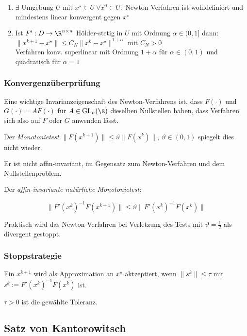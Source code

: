 \begin{enumerate}[label=(\alph*)]
	\item $\exists$ Umgebung $U$ mit $x^\star \in U \ \forall x^0 \in U : $ Newton-Verfahren ist wohldefiniert und mindestens linear konvergent gegen $x^\star$
	\item Ist $F' : D \to \R^{n \times n}$ Hölder-stetig in $U$ mit Ordnung $\alpha \in (0,1]$ dann: \\ $\|x^{k+1}-x^\star\| \leq C_N \|x^k-x^\star\|^{1+\alpha}$ mit $C_N > 0$ \\ Verfahren konv. superlinear mit Ordnung $1+\alpha$ für $\alpha \in (0,1)$ und quadratisch für $\alpha = 1$
\end{enumerate}

\subsubsection*{Konvergenzüberprüfung}

Eine wichtige Invarianzeigenschaft des Newton-Verfahrens ist, dass $F(\cdot)$ und $G(\cdot) = AF(\cdot)$ für $A \in \text{GL}_n(\R)$ dieselben Nullstellen haben, dass Verfahren sich also auf $F$ oder $G$ anwenden lässt.

Der \emph{Monotonietest} $\|F(x^{k+1})\| \leq \vartheta\|F(x^k)\|, \ \vartheta \in (0,1)$ spiegelt dies nicht wieder.

Er ist nicht affin-invariant, im Gegensatz zum Newton-Verfahren und dem Nullstellenproblem.

\vspace*{1mm}

Der \emph{affin-invariante natürliche Monotonietest}:

\vspace{-2mm}
$$\|F'(x^k)^{-1}F(x^{k+1})\| \leq \vartheta\|F'(x^k)^{-1}F(x^k)\|$$

Praktisch wird das Newton-Verfahren bei Verletzung des Tests mit $\vartheta = \frac{1}{2}$ als divergent gestoppt.

\subsubsection*{Stoppstrategie}

Ein $x^{k+1}$ wird als Approximation an $x^\star$ aktzeptiert, wenn $\|s^k\| \leq \tau$ mit $s^k := F'(x^k)^{-1}F(x^k)$ ist.

$\tau > 0$ ist die gewählte Toleranz.

\subsection*{Satz von Kantorowitsch}

